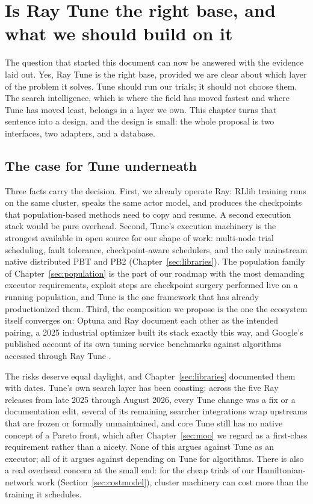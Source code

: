 \chapter{Is Ray Tune the right base, and what we should build on it}
\label{sec:architecture}

The question that started this document can now be answered with the
evidence laid out. Yes, Ray Tune is the right base, provided we are clear
about which layer of the problem it solves. Tune should run our trials; it
should not choose them. The search intelligence, which is where the field
has moved fastest and where Tune has moved least, belongs in a layer we
own. This chapter turns that sentence into a design, and the design is
small: the whole proposal is two interfaces, two adapters, and a database.

\section{The case for Tune underneath}

Three facts carry the decision. First, we already operate Ray: RLlib
training runs on the same cluster, speaks the same actor model, and
produces the checkpoints that population-based methods need to copy and
resume. A second execution stack would be pure overhead. Second, Tune's
execution machinery is the strongest available in open source for our
shape of work: multi-node trial scheduling, fault tolerance,
checkpoint-aware schedulers, and the only mainstream native distributed
PBT and PB2 (Chapter~\ref{sec:libraries}). The population family of
Chapter~\ref{sec:population} is the part of our roadmap with the most
demanding executor requirements, exploit steps are checkpoint surgery
performed live on a running population, and Tune is the one framework
that has already productionized them. Third, the composition we propose
is the one the ecosystem itself converges on: Optuna and Ray document
each other as the intended pairing, a 2025 industrial optimizer built
its stack exactly this way, and Google's published account of its own
tuning service benchmarks against algorithms accessed through Ray Tune
\citep{song2024vizier}.

The risks deserve equal daylight, and Chapter~\ref{sec:libraries}
documented them with dates. Tune's own search layer has been coasting:
across the five Ray releases from late 2025 through August 2026, every
Tune change was a fix or a documentation edit, several of its remaining
searcher integrations wrap upstreams that are frozen or formally
unmaintained, and core Tune still has no native concept of a Pareto
front, which after Chapter~\ref{sec:moo} we regard as a first-class
requirement rather than a nicety. None of this argues against Tune as an
executor; all of it argues against depending on Tune for algorithms.
There is also a real overhead concern at the small end: for the cheap
trials of our Hamiltonian-network work
(Section~\ref{sec:costmodel}), cluster machinery can cost more than the
training it schedules.

